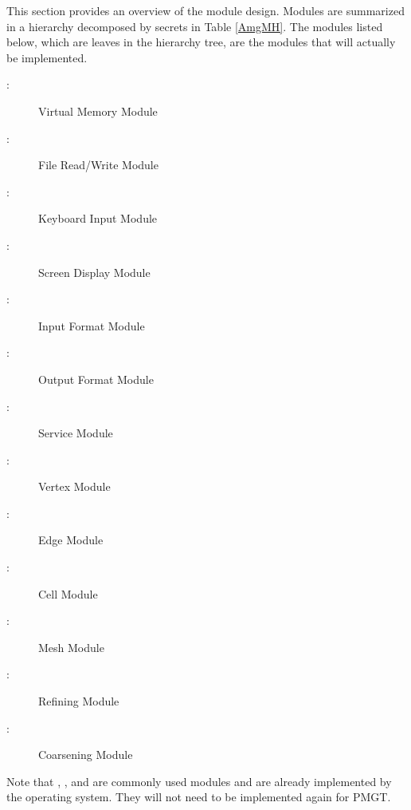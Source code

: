 \documentclass[12pt,titlepage]{article}
\begin{document}
This section provides an overview of the module design. Modules are summarized in a hierarchy decomposed by secrets in Table \ref{AmgMH}. The modules listed below, which are leaves in the hierarchy tree, are the modules that will actually be implemented.
\begin{description}
\item [ \mthemnum \label{mMemory}:] Virtual Memory Module
\item [ \mthemnum \label{mFileRW}:] File Read/Write Module
\item [ \mthemnum \label{mKeyboard}:] Keyboard Input Module
\item [ \mthemnum \label{mScreen}:] Screen Display Module
\item [ \mthemnum \label{mInput}:] Input Format Module
\item [ \mthemnum \label{mOutput}:] Output Format Module
\item [ \mthemnum \label{mService}:] Service Module
\item [ \mthemnum \label{mVertex}:] Vertex Module
\item [ \mthemnum \label{mEdge}:] Edge Module
\item [ \mthemnum \label{mCell}:] Cell Module
\item [ \mthemnum \label{mMesh}:] Mesh Module
\item [ \mthemnum \label{mRefining}:] Refining Module
\item [ \mthemnum \label{mCoarsening}:] Coarsening Module
\end{description}
Note that , ,  and  are commonly used modules and are already implemented by the operating system. They will not need to be implemented again for PMGT. 
\end{document}
